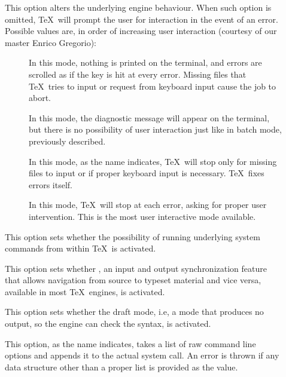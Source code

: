 \begin{description}
\begin{description}
\item[] This option alters the underlying engine behaviour. When such option is omitted, \TeX\ will prompt the user for interaction in the event of an error. Possible values are, in order of increasing user interaction (courtesy of our master Enrico Gregorio):

\begin{description}
\item[] In this mode, nothing is printed on the terminal, and errors are scrolled as if the  key is hit at every error. Missing files that \TeX\ tries to input or request from keyboard input cause the job to abort.

\item[] In this mode, the diagnostic message will appear on the terminal, but there is no possibility of user interaction just like in batch mode, previously described.

\item[] In this mode, as the name indicates, \TeX\ will stop only for missing files to input or if proper keyboard input is necessary. \TeX\ fixes errors itself.

\item[] In this mode, \TeX\ will stop at each error, asking for proper user intervention. This is the most user interactive mode available.
\end{description}

\item[] This option sets whether the possibility of running underlying system commands from within \TeX\ is activated.

\item[] This option sets whether , an input and output synchronization feature that allows navigation from source to typeset material and vice versa, available in most \TeX\ engines, is activated.

\item[] This option sets whether the draft mode, i.e, a mode that produces no output, so the engine can check the syntax, is activated.

\item[] This option, as the name indicates, takes a list of raw command line options and appends it to the actual system call. An error is thrown if any data structure other than a proper list is provided as the value.
\end{description}


\end{description}
